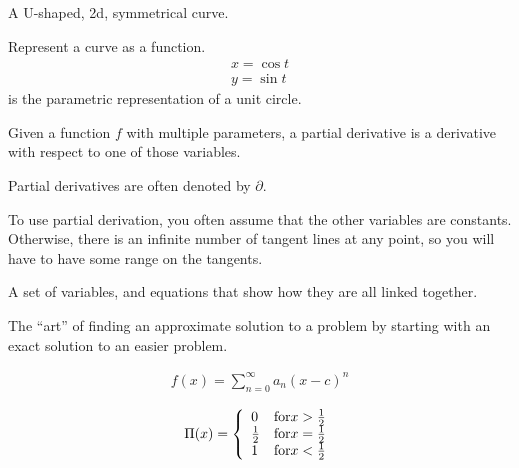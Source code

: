 \begin{definition}[Flow]
\begin{definition}[Parabola]
    A U-shaped, 2d, symmetrical curve.
\end{definition}

\begin{definition}[Parameterization]
    Represent a curve as a function.
    \begin{align}
        x = \cos{t} \\
        y = \sin{t}
    \end{align}
    is the parametric representation of a unit circle.

\begin{definition}
    Given a function $f$ with multiple parameters, a partial derivative is a
    derivative with respect to one of those variables.

    Partial derivatives are often denoted by $\partial$.

    To use partial derivation, you often assume that the other variables are 
    constants. Otherwise, there is an infinite number of tangent lines at
    any point, so you will have to have some range on the tangents.

\end{definition}

\end{definition}

\begin{definition}
    A set of variables, and equations that show how they are all linked 
    together.
\end{definition}

\begin{definition}\label{pertubation}
    The ``art'' of finding an approximate solution to a problem by starting
    with an exact solution to an easier problem.
\end{definition}


\begin{definition}\label{powerseries}
    \begin{align}
        f(x) = \sum\limits_{n=0}^{\infty}{a_{n}{(x-c)}^{n}}
    \end{align}
\end{definition}

\begin{definition}
    $$
    \Pi(x) = \left\{
            \begin{array}{l l}
                0 & \text{for} x > \frac{1}{2} \\
                \frac{1}{2} & \text{for} x = \frac{1}{2} \\
                1 & \text{for} x < \frac{1}{2} \\
            \end{array}
        \right.
    $$
\end{definition}


\end{definition}
